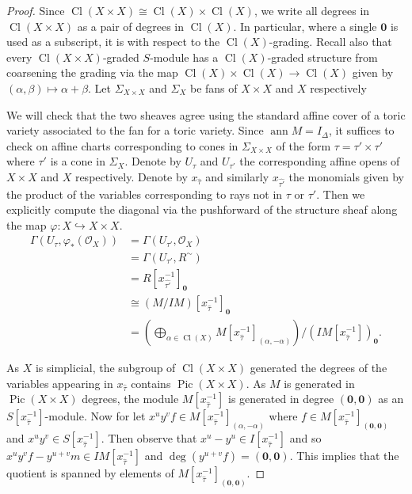 \documentclass{amsart}
\newcommand{\cO}{\mathcal O}
\DeclareMathOperator{\Pic}{Pic}
\DeclareMathOperator{\Cl}{Cl}
\theoremstyle{remark}
\begin{document}
\begin{proof}
  Since $\Cl(X\times X)\cong \Cl(X)\times \Cl(X)$, we write all degrees in $\Cl(X\times X)$ as a pair of degrees in $\Cl(X)$.
  In particular, where a single $\bm{0}$ is used as a subscript, it is with respect to the $\Cl(X)$-grading. Recall also that every $\Cl(X\times X)$-graded $S$-module has a $\Cl(X)$-graded structure from coarsening the grading via the map $\Cl(X)\times \Cl(X)\rightarrow \Cl(X)$ given by $(\alpha,\beta)\mapsto \alpha+\beta$. Let $\Sigma_{X\times X}$ and $\Sigma_{X}$ be fans of $X\times X$ and $X$ respectively

  We will check that the two sheaves agree using the standard affine cover of a toric variety associated to the fan for a toric variety.
  Since $\operatorname{ann} M = I_{\Delta}$, it suffices to check on
  affine charts corresponding to cones in $\Sigma_{X\times X}$ of the form
  $\tau = \tau'\times \tau'$ where $\tau'$ is a cone in $\Sigma_X$.
  Denote by $U_\tau$ and $U_{\tau'}$ the corresponding affine opens of $X\times X$ and $X$ respectively.
  Denote by $x_{\widehat{\tau}}$ and similarly $x_{\widehat{\tau'}}$
  the monomials given by the product of the variables corresponding to rays not in $\tau$ or $\tau'$.
  Then we explicitly compute the diagonal via the pushforward of the structure sheaf along the map
  $\varphi : X\hookrightarrow X\times X$.
  \begin{align*}
    \Gamma(U_\tau,\varphi_*(\cO_X)) &= \Gamma(U_{\tau'},\cO_X)\\
    &= \Gamma(U_{\tau'}, R^{\sim})\\
    &= R[x_{\widehat{\tau'}}^{-1}]_{\bm{0}} \\
    &\cong (M/IM)[x_{\widehat{\tau}}^{-1}]_{\bm{0}}\\
    &= \left(\bigoplus_{\alpha\in \Cl(X)}M[x_{\widehat{\tau}}^{-1}]_{(\alpha,-\alpha)}\right)/(IM[x_{\widehat{\tau}}^{-1}])_{\bm{0}}.
  \end{align*}

  
  As $X$ is simplicial, the subgroup of $\Cl(X\times X)$ generated the degrees of the variables
  appearing in $x_{\widehat{\tau}}$ contains $\Pic(X\times X)$.
  As $M$ is generated in $\Pic(X\times X)$ degrees, the module $M[x_{\widehat{\tau}}^{-1}]$
  is generated in degree $(\bm{0},\bm{0})$ as an $S[x_{\widehat{\tau}}^{-1}]$-module.
  Now for let $x^{u}y^{v}f\in M[x_{\widehat{\tau}}^{-1}]_{(\alpha,-\alpha)}$ where $f\in M[x_{\widehat{\tau}}^{-1}]_{(\bm{0},\bm{0})}$ and $x^{u}y^{v}\in S[x_{\widehat{\tau}}^{-1}]$.
  Then observe that $x^{u}-y^{u}\in I[x_{\widehat{\tau}}^{-1}]$ and so $x^{u}y^{v}f-y^{u+v}m\in IM[x_{\widehat{\tau}}^{-1}]$ and $\deg(y^{u+v}f) = (\bm{0},\bm{0})$.
  This implies that the quotient is spanned by elements of
  $M[x_{\widehat{\tau}}^{-1}]_{(\bm{0},\bm{0})}$.


\end{proof}
\end{document}

